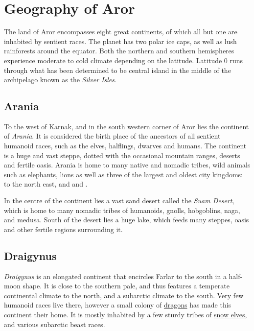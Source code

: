 \section{Geography of Aror}
\label{sec:Geography}

The land of Aror encompasses eight great continents, of which all but one are
inhabited by sentient races. The planet has two polar ice caps, as well as lush
rainforests around the equator. Both the northern and southern hemispheres
experience moderate to cold climate depending on the latitude. Latitude 0 runs
through what has been determined to be central island in the middle of the
archipelago known as the \emph{Silver Isles}.

\subsection{Arania}
\label{sec:Arania}

To the west of Karnak, and in the south western corner of Aror lies the
continent of \emph{Arania}. It is considered the birth place of the ancestors
of all sentient humanoid races, such as the elves, halflings, dwarves and
humans. The continent is a huge and vast steppe, dotted with the occasional
mountain ranges, deserts and fertile oasis. Arania is home to many native and
nomadic tribes, wild animals such as elephants, lions as well as three of the
largest and oldest city kingdoms:  to the north
east, and  and .

In the centre of the continent lies a vast sand desert called the \emph{Suam
  Desert}, which is home to many nomadic tribes of humanoids, gnolls,
hobgoblins, naga, and medusa. South of the desert lies a huge lake, which
feeds many steppes, oasis and other fertile regions surrounding it.

\subsection{Draigynus}
\label{sec:Draigynus}

\emph{Draigynus} is an elongated continent that encircles Farlar to the south
in a half-moon shape. It is close to the southern pale, and thus features a
temperate continental climate to the north, and a subarctic climate to the
south. Very few humanoid races live there, however a small colony of
\hyperref[sec:Dragons]{dragons} has made this continent their home. It is
mostly inhabited by a few sturdy tribes of \hyperref[sec:Snow Elves]{snow
  elves}, and various subarctic beast races.

